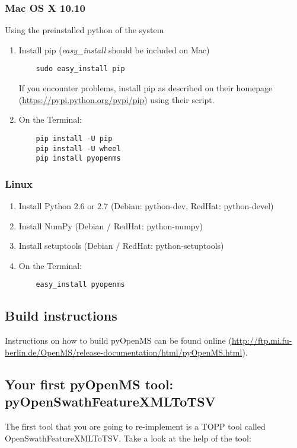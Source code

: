 {\subsubsection{Mac OS X 10.10}
Using the preinstalled python of the system 
\begin{enumerate}
  \item Install pip (\textit{easy\_install} should be included on Mac)
    \begin{lstlisting}
    sudo easy_install pip
    \end{lstlisting} 
    If you encounter problems, install pip as described on their homepage
    (\url{https://pypi.python.org/pypi/pip}) using their script.
  \item On the Terminal:
    \begin{lstlisting}
    pip install -U pip
	pip install -U wheel
	pip install pyopenms
    \end{lstlisting}
\end{enumerate}

\subsubsection{Linux}
\begin{enumerate}
  \item Install Python 2.6 or 2.7 (Debian: python-dev, RedHat: python-devel)
  \item Install NumPy (Debian / RedHat: python-numpy)
  \item Install setuptools (Debian / RedHat: python-setuptools)
  \item On the Terminal:
    \begin{lstlisting}
    easy_install pyopenms
    \end{lstlisting}
\end{enumerate}

\subsection{Build instructions}
Instructions on how to build pyOpenMS can be found online (\url{http://ftp.mi.fu-berlin.de/OpenMS/release-documentation/html/pyOpenMS.html}).

\subsection{Your first pyOpenMS tool: pyOpenSwathFeatureXMLToTSV}
The first tool that you are going to re-implement is a TOPP tool called OpenSwathFeatureXMLToTSV. Take a look at the help of the tool:

}
